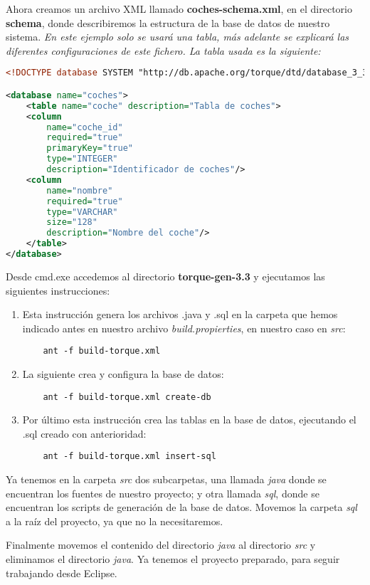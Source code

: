 Ahora creamos un archivo XML llamado {\bf coches-schema.xml}, en el directorio {\bf schema}, donde describiremos la estructura de la base de datos de nuestro sistema.
{\em En este ejemplo solo se usará una tabla, más adelante se explicará las diferentes configuraciones de este fichero. La tabla usada es la siguiente:}

\begin{lstlisting}[language=xml]
<!DOCTYPE database SYSTEM "http://db.apache.org/torque/dtd/database_3_3.dtd">

<database name="coches">
	<table name="coche" description="Tabla de coches">
	<column
		name="coche_id"
		required="true"
		primaryKey="true"
		type="INTEGER"
		description="Identificador de coches"/>
	<column
		name="nombre"
		required="true"
		type="VARCHAR"
		size="128"
		description="Nombre del coche"/>
	</table>
</database>
\end{lstlisting}

Desde cmd.exe accedemos al directorio {\bf torque-gen-3.3} y ejecutamos las siguientes instrucciones:
\begin{enumerate}
	\item Esta instrucción genera los archivos .java y .sql en la carpeta que hemos indicado antes en nuestro archivo {\em build.propierties}, en nuestro caso en {\em src}:
	\begin{lstlisting}
	ant -f build-torque.xml
	\end{lstlisting}
	 
	\item La siguiente crea y configura la base de datos:
	\begin{lstlisting}
	ant -f build-torque.xml create-db
	\end{lstlisting}
	
	\item Por último esta instrucción crea las tablas en la base de datos, ejecutando el .sql creado con anterioridad: 
	\begin{lstlisting}
	ant -f build-torque.xml insert-sql
	\end{lstlisting}
\end{enumerate}

Ya tenemos en la carpeta {\em src} dos subcarpetas, una llamada {\em java} donde se encuentran los fuentes de nuestro proyecto; y otra llamada {\em sql}, donde se encuentran los scripts de generación de la base de datos. Movemos la carpeta {\em sql} a la raíz del proyecto, ya que no la necesitaremos.

Finalmente movemos el contenido del directorio {\em java} al directorio {\em src} y eliminamos el directorio {\em java}. Ya tenemos el proyecto preparado, para seguir trabajando desde Eclipse.